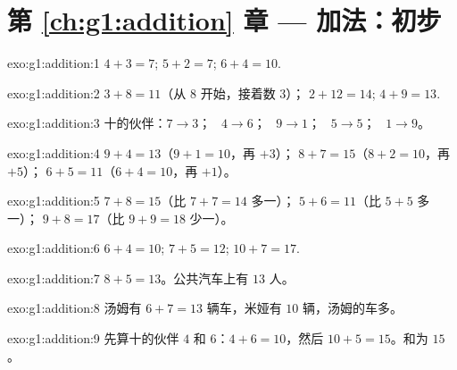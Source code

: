 \section*{第 \ref{ch:g1:addition} 章 --- 加法：初步}

\begin{solution}{exo:g1:addition:1}
$4 + 3 = 7$; \quad $5 + 2 = 7$; \quad $6 + 4 = 10$.
\end{solution}

\begin{solution}{exo:g1:addition:2}
$3 + 8 = 11$（从 $8$ 开始，接着数 $3$）；\quad
$2 + 12 = 14$; \quad $4 + 9 = 13$.
\end{solution}

\begin{solution}{exo:g1:addition:3}
十的伙伴：$7 \to 3$； \ $4 \to 6$； \ $9 \to 1$； \ $5 \to 5$；
\ $1 \to 9$。
\end{solution}

\begin{solution}{exo:g1:addition:4}
$9 + 4 = 13$（$9 + 1 = 10$，再 $+3$）；\quad
$8 + 7 = 15$（$8 + 2 = 10$，再 $+5$）；\quad
$6 + 5 = 11$（$6 + 4 = 10$，再 $+1$）。
\end{solution}

\begin{solution}{exo:g1:addition:5}
$7 + 8 = 15$（比 $7 + 7 = 14$ 多一）；\quad
$5 + 6 = 11$（比 $5 + 5$ 多一）；\quad
$9 + 8 = 17$（比 $9 + 9 = 18$ 少一）。
\end{solution}

\begin{solution}{exo:g1:addition:6}
$6 + 4 = 10$; \quad $7 + 5 = 12$; \quad $10 + 7 = 17$.
\end{solution}

\begin{solution}{exo:g1:addition:7}
$8 + 5 = 13$。公共汽车上有 $13$ 人。
\end{solution}

\begin{solution}{exo:g1:addition:8}
汤姆有 $6 + 7 = 13$ 辆车，米娅有 $10$ 辆，汤姆的车多。
\end{solution}

\begin{solution}{exo:g1:addition:9}
先算十的伙伴 $4$ 和 $6$：$4 + 6 = 10$，然后
$10 + 5 = 15$。和为 $15$。
\end{solution}
